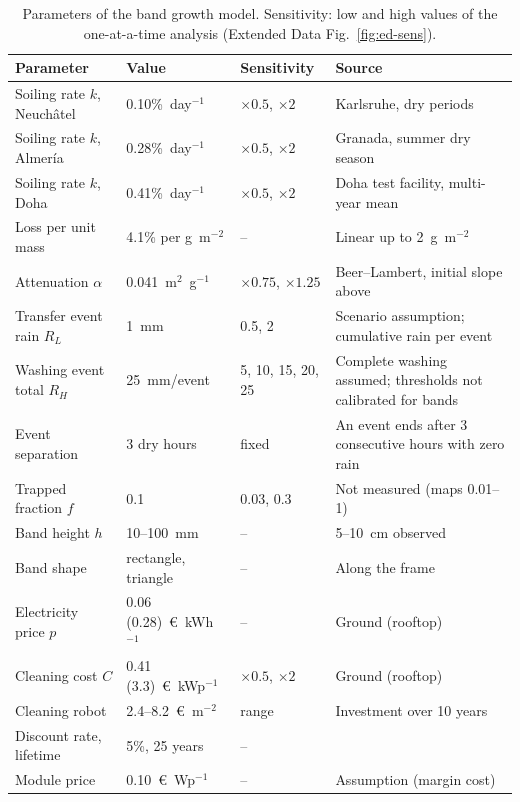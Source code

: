 \begin{table}[!t]
\caption{Parameters of the band growth model. Sensitivity: low and high values of the one-at-a-time analysis (Extended Data Fig.~\ref{fig:ed-sens}).\label{tab:bandparams}}
\begin{tabularx}{\textwidth}{p{3.6cm}p{3.0cm}p{2.3cm}X}
\toprule
\textbf{Parameter} & \textbf{Value} & \textbf{Sensitivity} & \textbf{Source} \\
\midrule
\rowcolor{tabgrey} Soiling rate $k$, Neuch\^atel & 0.10\%~day$^{-1}$ & $\times 0.5$, $\times 2$ & Karlsruhe, dry periods \cite{WorldEnergyMeteorology} \\
Soiling rate $k$, Almer\'ia & 0.28\%~day$^{-1}$ & $\times 0.5$, $\times 2$ & Granada, summer dry season \cite{micheliEconomicsSeasonalPhotovoltaic2021} \\
\rowcolor{tabgrey} Soiling rate $k$, Doha & 0.41\%~day$^{-1}$ & $\times 0.5$, $\times 2$ & Doha test facility, multi-year mean \cite{ahziInvestigationPVSoiling} \\
Loss per unit mass & 4.1\% per g~m$^{-2}$ & -- & Linear up to 2~g~m$^{-2}$ \cite{boyleNaturalSoilingPhotovoltaic2015} \\
\rowcolor{tabgrey} Attenuation $\alpha$ & 0.041~m$^{2}$~g$^{-1}$ & $\times 0.75$, $\times 1.25$ & Beer--Lambert, initial slope above \\
Transfer event rain $R_L$ & 1~mm & 0.5, 2 & Scenario assumption; cumulative rain per event \\
\rowcolor{tabgrey} Washing event total $R_H$ & 25~mm/event & 5, 10, 15, 20, 25 & Complete washing assumed; thresholds not calibrated for bands \\
Event separation & 3 dry hours & fixed & An event ends after 3 consecutive hours with zero rain \\
\rowcolor{tabgrey} Trapped fraction $f$ & 0.1 & 0.03, 0.3 & Not measured (maps 0.01--1) \\
Band height $h$ & 10--100~mm & -- & 5--10~cm observed \cite{yanYao2018} \\
\rowcolor{tabgrey} Band shape & rectangle, triangle & -- & Along the frame \cite{cuiCharacterizationSoilingBands2021a} \\
Electricity price $p$ & 0.06 (0.28)~\euro~kWh$^{-1}$ & -- & Ground (rooftop) \cite{ilseTechnoEconomicAssessmentSoiling2019a} \\
\rowcolor{tabgrey} Cleaning cost $C$ & 0.41 (3.3)~\euro~kWp$^{-1}$ & $\times 0.5$, $\times 2$ & Ground (rooftop) \cite{ilseTechnoEconomicAssessmentSoiling2019a} \\
Cleaning robot & 2.4--8.2~\euro~m$^{-2}$ & range & Investment over 10 years \cite{ilseTechnoEconomicAssessmentSoiling2019a} \\
\rowcolor{tabgrey} Discount rate, lifetime & 5\%, 25 years & -- & \cite{ilseTechnoEconomicAssessmentSoiling2019a} \\
Module price & 0.10~\euro~Wp$^{-1}$ & -- & Assumption (margin cost) \\
\bottomrule
\end{tabularx}
\end{table}
